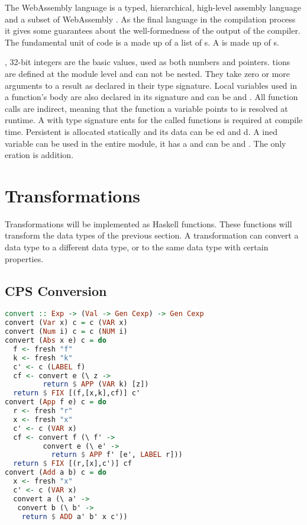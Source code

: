 {The WebAssembly language is a typed, hierarchical, high-level assembly language and a subset of WebAssembly \autocite{webassemblyhomepage}. As the final language in the compilation process it gives some guarantees about the well-formedness of the output of the compiler. The fundamental unit of code is a  made up of a list of s. A  is made up of s.

, 32-bit integers are the basic values, used as both numbers and pointers. tions are defined at the module level and can not be nested. They take zero or more arguments to a result as declared in their type signature. Local variables used in a function's body are also declared in its signature and can be  and . All function calls are indirect, meaning that the function a variable points to is resolved at runtime. A  with type signature ents for the called functions is required at compile time. Persistent  is allocated statically and its data can be ed and d. A ined variable can be used in the entire module, it has a  and can be  and . The only eration is addition.

\section{\label{section:transforms}Transformations}
Transformations will be implemented as Haskell functions. These functions will transform the data types of the previous section. A transformation can convert a data type to a different data type, or to the same data type with certain properties.

\subsection{\label{subsection:cpsconvert}CPS Conversion}
\begin{lstlisting}[language=Haskell]
convert :: Exp -> (Val -> Gen Cexp) -> Gen Cexp
convert (Var x) c = c (VAR x)
convert (Num i) c = c (NUM i)
convert (Abs x e) c = do
  f <- fresh "f"
  k <- fresh "k"
  c' <- c (LABEL f)
  cf <- convert e (\ z ->
         return $ APP (VAR k) [z])
  return $ FIX [(f,[x,k],cf)] c'
convert (App f e) c = do
  r <- fresh "r"
  x <- fresh "x"
  c' <- c (VAR x)
  cf <- convert f (\ f' ->
         convert e (\ e' ->
           return $ APP f' [e', LABEL r]))
  return $ FIX [(r,[x],c')] cf
convert (Add a b) c = do
  x <- fresh "x"
  c' <- c (VAR x)
  convert a (\ a' ->
   convert b (\ b' ->
    return $ ADD a' b' x c'))
\end{lstlisting}

}
